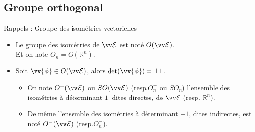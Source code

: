 \documentclass{m53beamer}
\begin{document}
\subsection{Groupe orthogonal}
\begin{frame}{Rappels : Groupe des isométries vectorielles}
  \begin{itemize}[<+(1)->]
    \item Le \alert{groupe des isométries} de $\ev{E}$ est noté $O(\ev{E})$.\\
      Et on note $O_{n} = O(\mathbb{R}^{n})$.\pause\\
    \item Soit $\vv{\phi} \in O(\ev{E})$, alors $\det(\vv{\phi}) = \pm 1$.
      \begin{itemize}[<+(1)->]
        \item On note $O^{+}(\ev{E})$ ou $SO(\ev{E})$ (resp.$O_{n}^{+}$ ou $SO_{n}$) l'ensemble des isométries à déterminant $1$, dites \alert{directes}, de $\ev{E}$ (resp. $\mathbb{R}^{n}$).
        \item De même l'ensemble des isométries à déterminant $-1$, dites \alert{indirectes}, est noté $O^{-}(\ev{E})$ (resp.$O_{n}^{-}$).
      \end{itemize}\pause
  \end{itemize}
\end{frame}

\end{document}
